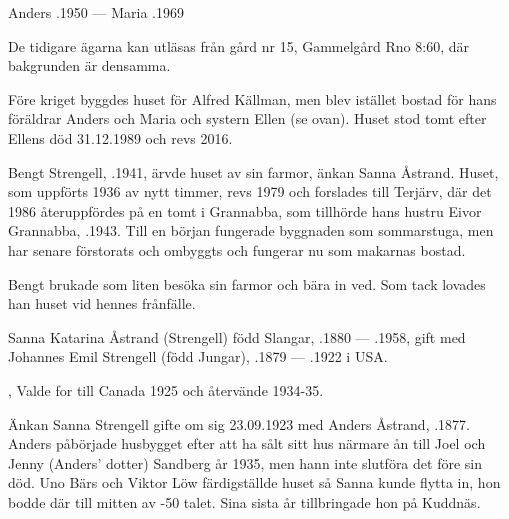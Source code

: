 Anders .1950  ---  Maria .1969

De tidigare ägarna kan utläsas från gård nr 15, Gammelgård Rno 8:60, där bakgrunden är densamma.




Före kriget byggdes huset för Alfred Källman, men blev istället bostad för hans föräldrar Anders och Maria och systern Ellen (se ovan). Huset stod tomt efter Ellens död 31.12.1989 och revs 2016.\jhvspace{}




Bengt Strengell, .1941, ärvde huset av sin farmor, änkan Sanna Åstrand. Huset, som uppförts 1936 av nytt timmer, revs 1979 och forslades till Terjärv, där det 1986 återuppfördes på en tomt i Grannabba, som tillhörde hans hustru Eivor Grannabba, .1943. Till en början fungerade byggnaden som sommarstuga, men har senare förstorats och ombyggts och fungerar nu som makarnas bostad.

Bengt brukade som liten besöka sin farmor och bära in ved. Som tack lovades han huset vid hennes frånfälle.



Sanna Katarina Åstrand (Strengell) född Slangar, .1880 --- .1958, gift med Johannes Emil Strengell (född Jungar), .1879 --- .1922  i USA.
\begin{jhchildren}
  \item {}
  \item {}
  \item {}, Valde for till Canada 1925 och återvände 1934-35.
\end{jhchildren}
Änkan Sanna Strengell gifte om sig 23.09.1923 med Anders Åstrand, .1877. Anders påbörjade husbygget efter att ha sålt sitt hus närmare ån till Joel och Jenny (Anders' dotter) Sandberg år 1935, men hann inte slutföra det före sin död. Uno Bärs och Viktor Löw färdigställde huset så Sanna kunde flytta in, hon bodde där till mitten av -50 talet. Sina sista år tillbringade hon på Kuddnäs.


